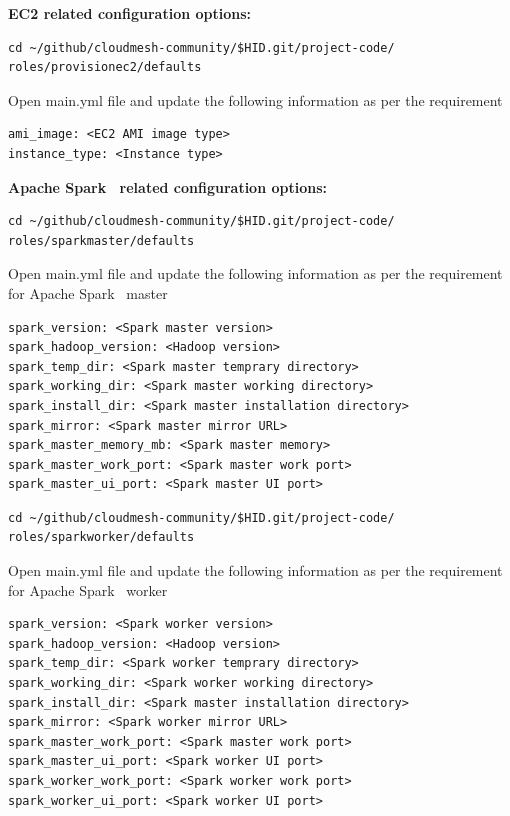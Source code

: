 \textbf{EC2 related configuration options:}

\begin{verbatim}
cd ~/github/cloudmesh-community/$HID.git/project-code/
roles/provisionec2/defaults
\end{verbatim}

Open main.yml file and update the following information as per the
requirement

\begin{verbatim}
ami_image: <EC2 AMI image type>
instance_type: <Instance type>
\end{verbatim}

\textbf{Apache Spark~\cite{hid-sp18-511-www-spark} related configuration
options:}

\begin{verbatim}
cd ~/github/cloudmesh-community/$HID.git/project-code/
roles/sparkmaster/defaults
\end{verbatim}

Open main.yml file and update the following information as per the
requirement for Apache Spark~\cite{hid-sp18-511-www-spark} master

\begin{verbatim}
spark_version: <Spark master version>
spark_hadoop_version: <Hadoop version>
spark_temp_dir: <Spark master temprary directory>
spark_working_dir: <Spark master working directory>
spark_install_dir: <Spark master installation directory>
spark_mirror: <Spark master mirror URL>
spark_master_memory_mb: <Spark master memory>
spark_master_work_port: <Spark master work port>
spark_master_ui_port: <Spark master UI port>
\end{verbatim}

\begin{verbatim}
cd ~/github/cloudmesh-community/$HID.git/project-code/
roles/sparkworker/defaults
\end{verbatim}

Open main.yml file and update the following information as per the
requirement for Apache Spark~\cite{hid-sp18-511-www-spark} worker

\begin{verbatim}
spark_version: <Spark worker version>
spark_hadoop_version: <Hadoop version>
spark_temp_dir: <Spark worker temprary directory>
spark_working_dir: <Spark worker working directory>
spark_install_dir: <Spark master installation directory>
spark_mirror: <Spark worker mirror URL>
spark_master_work_port: <Spark master work port>
spark_master_ui_port: <Spark worker UI port>
spark_worker_work_port: <Spark worker work port>
spark_worker_ui_port: <Spark worker UI port>
\end{verbatim}

